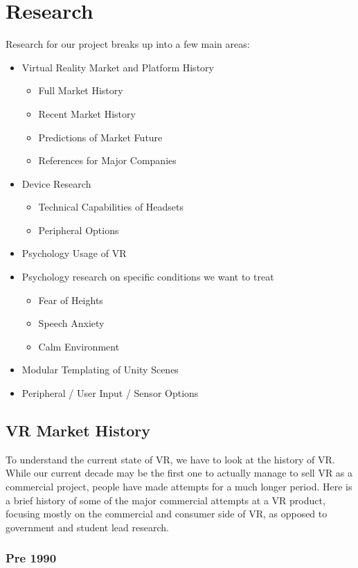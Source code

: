 \documentclass[a4paper,10pt]{article}
\begin{document}
\section{Research}
Research for our project breaks up into a few main areas:
\begin{itemize}
\item Virtual Reality Market and Platform History
	\begin{itemize}
	\item Full Market History
	\item Recent Market History
	\item Predictions of Market Future
	\item References for Major Companies
	\end{itemize}
\item Device Research
	\begin{itemize}
	\item Technical Capabilities of Headsets
	\item Peripheral Options
	\end{itemize}
\item Psychology Usage of VR
\item Psychology research on specific conditions we want to treat
	\begin{itemize}
	\item Fear of Heights
	\item Speech Anxiety
	\item Calm Environment
	\end{itemize}
\item Modular Templating of Unity Scenes
\item Peripheral / User Input / Sensor Options
\end{itemize}
\pagebreak
\subsection{VR Market History}
To understand the current state of VR, we have to look at the history of VR.  While our current decade may be the first one to actually manage to sell VR as a commercial project, people have made attempts for a much longer period.  Here is a brief history of some of the major commercial attempts at a VR product, focusing mostly on the commercial and consumer side of VR, as opposed to government and student lead research.

\subsubsection{Pre 1990}
	
\end{document}
